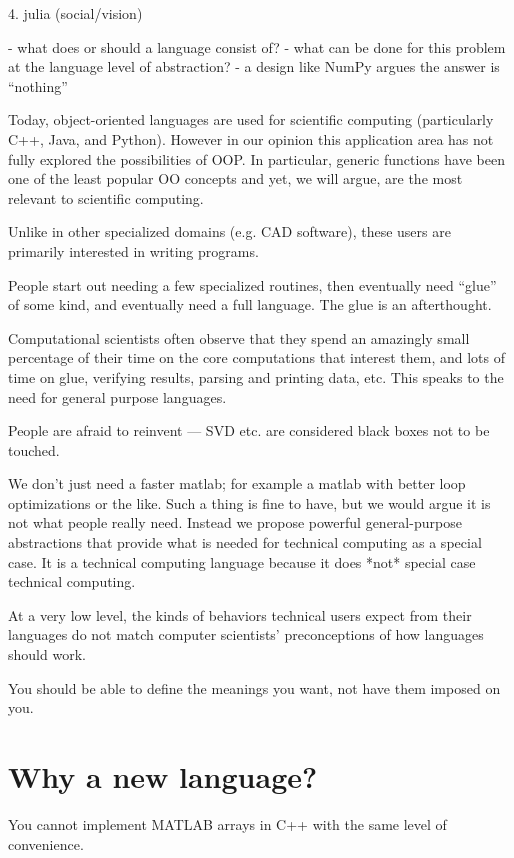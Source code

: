 4. julia (social/vision)


- what does or should a language consist of?
- what can be done for this problem at the language level of abstraction?
  - a design like NumPy argues the answer is ``nothing''

Today, object-oriented languages are used for scientific computing
(particularly C++, Java, and Python). However in our opinion this
application area has not fully explored the possibilities of OOP. In
particular, generic functions have been one of the least popular
OO concepts and yet, we will argue, are the most relevant to scientific
computing.



Unlike in other specialized domains (e.g. CAD software), these users
are primarily interested in writing programs.

People start out needing a few specialized routines, then eventually
need ``glue'' of some kind, and eventually need a full language.
The glue is an afterthought.

Computational scientists often observe that they spend an amazingly
small percentage of their time on the core computations that
interest them, and lots of time on glue, verifying results,
parsing and printing data, etc. This speaks to the need for
general purpose languages.

People are afraid to reinvent --- SVD etc. are considered black
boxes not to be touched.

We don't just need a faster matlab; for example a matlab with better
loop optimizations or the like. Such a thing is fine to have,
but we would argue it is not what people really need.
Instead we propose powerful general-purpose abstractions that
provide what is needed for technical computing as a special case.
It is a technical computing language because it does *not*
special case technical computing.


At a very low level, the kinds of behaviors technical users expect
from their languages do not match computer scientists' preconceptions
of how languages should work.

You should be able to define the meanings you want, not have them
imposed on you.


\section{Why a new language?}

You cannot implement MATLAB arrays in C++ with the same level of
convenience.

